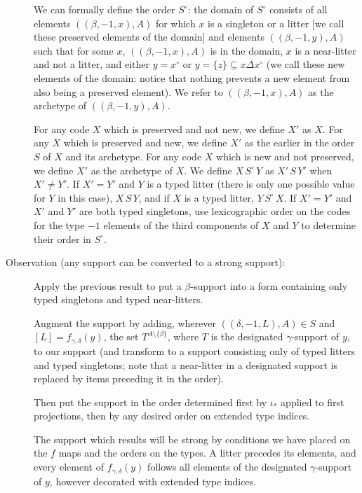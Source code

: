 \documentclass[112pt]{article}
\begin{document}
\begin{description}
We can formally define the order $S^\circ$:  the domain of $S^\circ$ consists of all elements $((\beta,-1,x),A)$ for which $x$ is a singleton or a litter [we call these preserved elements of the domain]  and elements $((\beta,-1,y),A)$ such that for some $x$, $((\beta,-1,x),A)$ is in the domain, $x$ is a near-litter and not a litter, 
and either $y=x^\circ$ or $y = \{z\} \subseteq x\Delta x^\circ$ (we call these new elements of the domain:  notice that nothing prevents a new element from also being a preserved element).  We refer to $((\beta,-1,x),A)$ as the archetype of $((\beta,-1,y),A)$.

For any code $X$ which is preserved and not new, we define $X'$ as $X$.  For any $X$ which is preserved and new, we define $X'$ as the earlier in the order
$S$ of $X$ and its archetype.  For any code $X$ which is new and not preserved, we define $X'$ as the archetype of $X$.  We define $X \, S^\circ \, Y$
as $X'\, S\, Y'$ when $X' \neq Y'$.  If $X'=Y'$ and $Y$ is a typed litter (there is only one possible value for $Y$ in this case), $X \, S \, Y$, and if $X$ is a typed litter, $Y \,S^\circ\, X$.  If $X'=Y'$ and $X'$ and $Y'$ are both typed singletons,
use lexicographic order on the codes for the type $-1$ elements of the third components of $X$ and $Y$ to determine their order in $S^\circ$.

\item[Observation (any support can be converted to a strong support):]  

Apply the previous result to put a $\beta$-support into a form containing only typed singletons and typed near-litters.

Augment the support by adding, wherever $((\delta,-1,L),A) \in S$ and $[L]=f_{\gamma,\delta}(y)$, the set $T^{A \setminus \{\beta\}}$, where $T$ is the designated $\gamma$-support
of $y$, to our support (and transform to a support consisting only of typed litters and typed singletons; note that a near-litter in a designated support is replaced by items preceding it in the order).

Then put the support in the order determined first by $\iota_*$ applied to first projections, then by any desired order on extended type indices.

The support which results will be strong by conditions we have placed on the $f$ maps and the orders on the types.  A litter precedes its elements, and
every element of $f_{\gamma,\delta}(y)$ follows all elements of the designated $\gamma$-support of $y$, however decorated with extended type indices.


\end{description}
\end{document}
